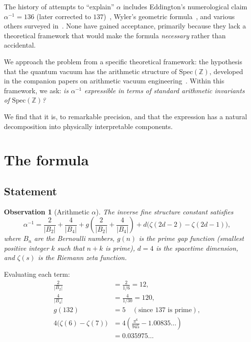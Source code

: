 \documentclass[11pt,a4paper]{article}
\newtheorem{observation}[theorem]{Observation}
\newcommand{\Spec}{\mathrm{Spec}}
\begin{document}
The history of attempts to ``explain'' $\alpha$ includes
Eddington's numerological claim $\alpha^{-1} = 136$
(later corrected to $137$)~\cite{Eddington1946}, Wyler's
geometric formula~\cite{Wyler1969}, and various others
surveyed in~\cite{Gilmore2008}. None have gained acceptance,
primarily because they lack a theoretical framework that would
make the formula \emph{necessary} rather than accidental.

We approach the problem from a specific theoretical framework:
the hypothesis that the quantum vacuum has the arithmetic
structure of $\Spec(\mathbb{Z})$, developed in the companion
papers on arithmetic vacuum engineering~\cite{paper_A,paper_C,paper_F}.
Within this framework, we ask: \emph{is $\alpha^{-1}$ expressible
in terms of standard arithmetic invariants of $\Spec(\mathbb{Z})$?}

We find that it is, to remarkable precision, and that the
expression has a natural decomposition into physically
interpretable components.

\section{The formula}
\label{sec:formula}

\subsection{Statement}

\begin{observation}[Arithmetic $\alpha$]
\label{obs:alpha}
The inverse fine structure constant satisfies
\begin{equation}
  \alpha^{-1} = \frac{2}{|B_2|} + \frac{4}{|B_4|}
  + g\!\left(\frac{2}{|B_2|} + \frac{4}{|B_4|}\right)
  + d\bigl(\zeta(2d{-}2) - \zeta(2d{-}1)\bigr),
  \label{eq:master}
\end{equation}
where $B_n$ are the Bernoulli numbers, $g(n)$ is the prime gap
function (smallest positive integer $k$ such that $n + k$ is prime),
$d = 4$ is the spacetime dimension, and $\zeta(s)$ is the Riemann
zeta function.
\end{observation}

Evaluating each term:
\begin{align}
  \frac{2}{|B_2|} &= \frac{2}{1/6} = 12, \label{eq:term1} \\
  \frac{4}{|B_4|} &= \frac{4}{1/30} = 120, \label{eq:term2} \\
  g(132) &= 5 \quad (\text{since } 137 \text{ is prime}), \label{eq:term3} \\
  4\bigl(\zeta(6) - \zeta(7)\bigr)
  &= 4\left(\frac{\pi^6}{945} - 1.00835\ldots\right) \nonumber \\
  &= 0.035975\ldots \label{eq:term4}
\end{align}
\end{document}
